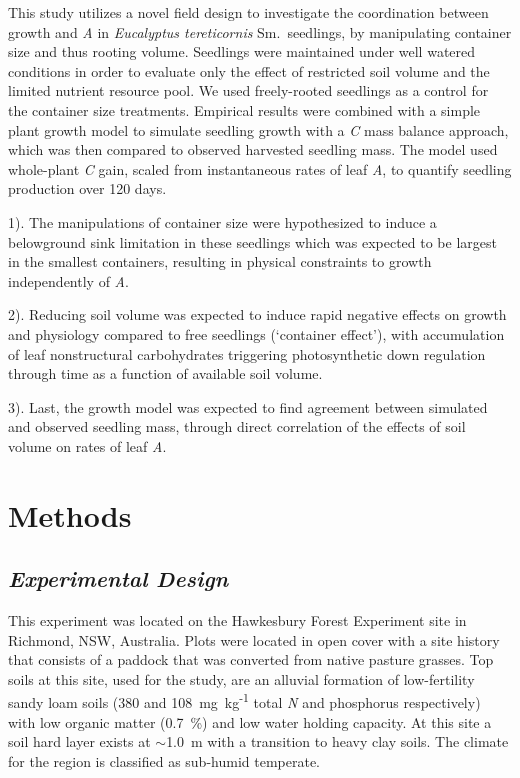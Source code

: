 \documentclass[a4paper]{article}\usepackage[]{graphicx}\usepackage[]{color}
\begin{document}
This study utilizes a novel field design to investigate the coordination between growth and \textit{A} in \textit{Eucalyptus tereticornis} Sm.~seedlings, by manipulating container size and thus rooting volume. Seedlings were maintained under well watered conditions in order to evaluate only the effect of restricted soil volume and the limited nutrient resource pool. We used freely-rooted seedlings as a control for the container size treatments.  Empirical results were combined with a simple plant growth model to simulate seedling growth with a \textit{C} mass balance approach, which was then compared to observed harvested seedling mass.  The model used whole-plant \textit{C} gain, scaled from instantaneous rates of leaf \textit{A}, to quantify seedling production over 120 days. 

1). The manipulations of container size were hypothesized to induce a belowground sink limitation in these seedlings      which was expected to be largest in the smallest containers, resulting in physical constraints to growth independently of \textit{A}.

2). Reducing soil volume was expected to induce rapid negative effects on growth and physiology compared to free seedlings (‘container effect’), with accumulation of leaf nonstructural carbohydrates triggering photosynthetic down regulation through time as a function of available soil volume.

3). Last, the growth model was expected to find agreement between simulated and observed seedling mass, through direct correlation of the effects of soil volume on rates of leaf \textit{A}.

\section*{Methods}

\subsection*{\textit{Experimental Design}}

This experiment was located on the Hawkesbury Forest Experiment site in Richmond, NSW, Australia. Plots were located in open cover with a site history that consists of a paddock that was converted from native pasture grasses. Top soils at this site, used for the study, are an alluvial formation of low-fertility sandy loam soils (380 and 108~mg~kg\textsuperscript{-1} total \textit{N} and phosphorus respectively) with low organic matter (0.7~\%) and low water holding capacity. At this site a soil hard layer exists at $\sim$1.0~m with a transition to heavy clay soils. The climate for the region is classified as sub-humid temperate. 
\end{document}

